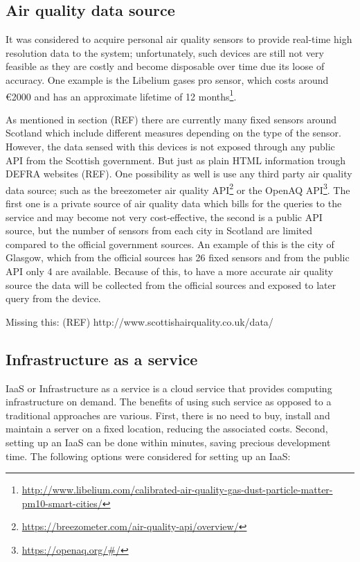 \subsection{Air quality data source}
It was considered to acquire personal air quality sensors to provide real-time high resolution data to the system; unfortunately, such devices are still not very feasible as they are costly and become disposable over time due its loose of accuracy. One example is the Libelium gases pro sensor, which costs around \euro{}2000 and has an approximate lifetime of 12 months\footnote{\url{http://www.libelium.com/calibrated-air-quality-gas-dust-particle-matter-pm10-smart-cities/}}. 

As mentioned in section (REF) there are currently many fixed sensors around Scotland which include different measures depending on the type of the sensor. However, the data sensed with this devices is not exposed through any public API from the Scottish government. But just as plain HTML information trough DEFRA websites (REF). One possibility as well is use any third party air quality data source; such as the breezometer air quality API\footnote{\url{https://breezometer.com/air-quality-api/overview/}} or the OpenAQ API\footnote{\url{https://openaq.org/#/}}. The first one is a private source of air quality data which bills for the queries to the service and may become not very cost-effective, the second is a public API source, but the number of sensors from each city in Scotland are limited compared to the official government sources. An example of this is the city of Glasgow, which from the official sources has 26 fixed sensors and from the public API only 4 are available. Because of this, to have a more accurate air quality source the data will be collected from the official sources and exposed to later query from the device. 

Missing this: (REF)
http://www.scottishairquality.co.uk/data/

\subsection{Infrastructure as a service}
IaaS or Infrastructure as a service is a cloud service that provides computing infrastructure on demand. The benefits of using such service as opposed to a traditional approaches are various. First, there is no need to buy, install and maintain a server on a fixed location, reducing the associated costs. Second, setting up an IaaS can be done within minutes, saving precious development time. The following options were considered for setting up an IaaS: 

